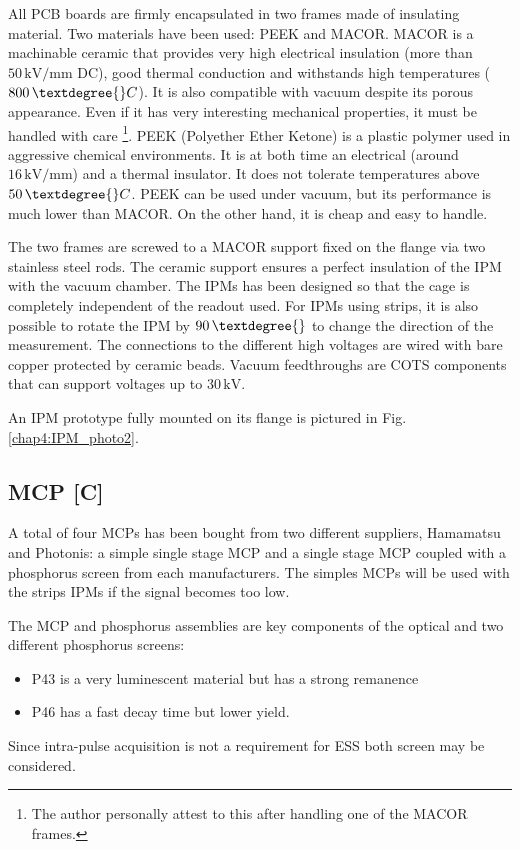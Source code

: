 \begin{refsection}
  All PCB boards are firmly encapsulated in two frames made of insulating material. Two materials have been used: PEEK and MACOR. MACOR is a machinable ceramic that provides very high electrical insulation (more than $50\,\mathrm{kV/mm}$ DC),  good thermal conduction and withstands high temperatures ($800\,\textdegree{}C$). It is also compatible with vacuum despite its porous appearance. Even if it has very interesting mechanical properties, it must be handled with care \footnote{The author personally attest to this after handling one of the MACOR frames.}. PEEK (Polyether Ether Ketone) is a plastic polymer used in aggressive chemical environments. It is at both time an electrical (around $16\,\mathrm{kV/mm}$) and a thermal insulator. It does not tolerate temperatures above $50\,\textdegree{}C$. PEEK can be used under vacuum, but its performance is much lower than MACOR. On the other hand, it is cheap and easy to handle.

  The two frames are screwed to a MACOR support fixed on the flange via two stainless steel rods. The ceramic support ensures a perfect insulation of the IPM with the vacuum chamber. The IPMs has been designed so that the cage is completely independent of the readout used. For IPMs using strips, it is also possible to rotate the IPM by $90\,\textdegree{}$ to change the direction of the measurement. The connections to the different high voltages are wired with bare copper  protected by ceramic beads. Vacuum feedthroughs are COTS components that can support voltages up to $30\,\mathrm{kV}$.

  An IPM prototype fully mounted on its flange is pictured in Fig. \ref{chap4:IPM_photo2}.

  \subsection{MCP [C]}
  A total of four MCPs has been bought from two different suppliers, Hamamatsu and Photonis: a simple single stage MCP and a single stage MCP coupled with a phosphorus screen from each manufacturers. The simples MCPs will be used with the strips IPMs if the signal becomes too low.

  The MCP and phosphorus assemblies are key components of the optical and two different phosphorus screens:
  \begin{itemize}
    \item P43 is a very luminescent material but has a strong remanence
    \item P46 has a fast decay time but lower yield.
  \end{itemize}
  Since intra-pulse acquisition is not a requirement for ESS both screen may be considered.


\end{refsection}
